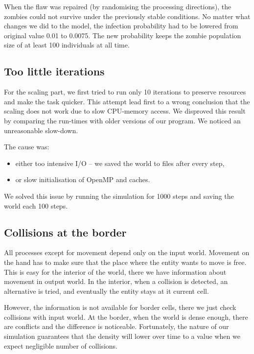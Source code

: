 \documentclass[a4paper]{article}
\begin{document}
When the flaw was repaired (by randomising the processing directions), the zombies could not survive under the previously stable conditions.
No matter what changes we did to the model, the infection probability had to be lowered from original value 0.01 to 0.0075.
The new probability keeps the zombie population size of at least 100 individuals at all time.

\subsection{Too little iterations}

For the scaling part, we first tried to run only 10 iterations to preserve resources and make the task quicker.
This attempt lead first to a wrong conclusion that the scaling does not work due to slow CPU-memory access.
We disproved this result by comparing the run-times with older versions of our program.
We noticed an unreasonable slow-down.

The cause was:
\begin{itemize}
\item either too intensive I/O -- we saved the world to files after every step,
\item or slow initialisation of OpenMP and caches.
\end{itemize}

We solved this issue by running the simulation for 1000 steps and saving the world each 100 steps.

\subsection{Collisions at the border}

All processes except for movement depend only on the input world.
Movement on the hand has to make sure that the place where the entity wants to move is free.
This is easy for the interior of the world, there we have information about movement in output world.
In the interior, when a collision is detected, an alternative is tried, and eventually the entity stays at it current cell.

However, the information is not available for border cells, there we just check collisions with input world.
At the border, when the world is dense enough, there are conflicts and the difference is noticeable.
Fortunately, the nature of our simulation guarantees that the density will lower over time to a value when we expect negligible number of collisions.
\end{document}
